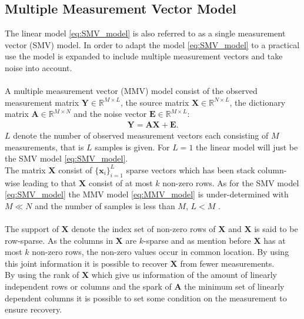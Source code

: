\subsection{Multiple Measurement Vector Model}\label{sec:MMV}
The linear model \eqref{eq:SMV_model} is also referred to as a single measurement vector (SMV) model. In order to adapt the model \eqref{eq:SMV_model} to a practical use the model is expanded to include multiple measurement vectors and take noise into account.
\\ \\
A multiple measurement vector (MMV) model consist of the observed measurement matrix $\mathbf{Y} \in \mathbb{R}^{M \times L}$, the source matrix $\mathbf{X} \in \mathbb{R}^{N \times L}$, the dictionary matrix $\mathbf{A} \in \mathbb{R}^{M \times N}$ and the noise vector $\textbf{E} \in \mathbb{R}^{M \times L}$:
\begin{align}\label{eq:MMV_model}
\mathbf{Y} = \mathbf{AX}+\textbf{E}.
\end{align}
$L$ denote the number of observed measurement vectors each consisting of $M$ measurements, that is $L$ samples is given. For $L = 1$ the linear model will just be the SMV model \eqref{eq:SMV_model}. 
\\
The matrix $\mathbf{X}$ consist of $\lbrace \mathbf{x}_i \rbrace_{i=1}^L$ sparse vectors which has been stack column-wise leading to that $\mathbf{X}$ consist of at most $k$ non-zero rows. As for the SMV model \eqref{eq:SMV_model} the MMV model \eqref{eq:MMV_model} is under-determined with $M \ll N$ and the number of samples is less than $M$, $L < M$ \cite[p. 42]{CS}.
\\ \\
The support of $\mathbf{X}$ denote the index set of non-zero rows of $\mathbf{X}$ and $\mathbf{X}$ is said to be row-sparse. As the columns in $\mathbf{X}$ are $k$-sparse and as mention before $\mathbf{X}$ has at most $k$ non-zero rows, the non-zero values occur in common location. By using this joint information it is possible to recover $\mathbf{X}$ from fewer measurements.
\\
By using the rank of $\mathbf{X}$ which give us information of the amount of linearly independent rows or columns and the spark of $\mathbf{A}$ the minimum set of linearly dependent columns it is possible to set some condition on the measurement to ensure recovery.
\\
